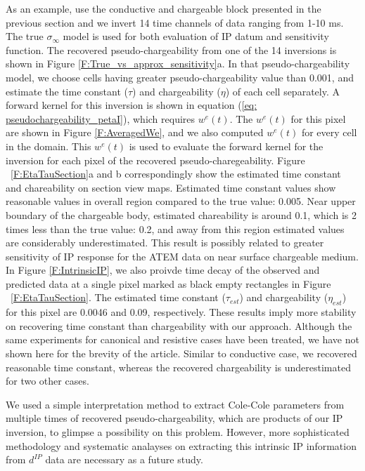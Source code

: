 \documentclass[extra,mreferee]{gji}
\newcommand{\siginf}{\sigma_\infty}
\newcommand{\dip}{d^{IP}}
\begin{document}
As an example, use the conductive and chargeable block presented in the previous section and we invert 14 time channels of data ranging from 1-10 ms.  The true $\siginf$ model is used  for both evaluation of IP datum and sensitivity function. The recovered pseudo-chargeability from one of the 14 inversions is shown in Figure \ref{F:True_vs_approx_sensitivity}a. In that pseudo-chargeability model, we choose cells having greater pseudo-chargeability value than 0.001, and estimate the time constant ($\tau$) and chargeability ($\eta$) of each cell separately. 
A forward kernel for this inversion is shown in equation (\ref{eq: pseudochargeability_petaI}), which requires $w^e(t)$. 
The $w^e(t)$ for this pixel are shown in Figure \ref{F:AveragedWe}, and we also computed $w^e(t)$ for every cell in the domain. This $w^e(t)$ is used to evaluate the forward kernel for the inversion for each pixel of the recovered pseudo-charegeability.
Figure ~\ref{F:EtaTauSection}a and b correspondingly show the estimated time constant and chareability on section view maps.
Estimated time constant values show reasonable values in overall region compared to the true value: 0.005. 
Near upper boundary of the chargeable body, estimated chareability is around 0.1, which is 2 times less than the true value: 0.2, and away from this region estimated values are considerably underestimated. 
This result is possibly related to greater sensitivity of IP response for the ATEM data on near surface chargeable medium. 
In Figure \ref{F:IntrinsicIP}, we also proivde time decay of the observed and predicted data at a single pixel marked as black empty rectangles in Figure ~\ref{F:EtaTauSection}.
The estimated time constant ($\tau_{est}$) and chargeability ($\eta_{est}$) for this pixel are 0.0046 and 0.09, respectively. 
These results imply more stability on recovering time constant than chargeability with our approach. Although the same experiments for canonical and resistive cases have been treated, we have not shown here for the brevity of the article.
Similar to conductive case, we recovered reasonable time constant, whereas the recovered chargeability is underestimated for two other cases. 

We used a simple interpretation method to extract Cole-Cole parameters from multiple times of recovered pseudo-chargeability, which are products of our IP inversion, to glimpse a possibility on this problem. 
However, more sophisticated methodology and systematic analayses on extracting this intrinsic IP information from $\dip$ data are necessary as a future study. 
\end{document}
